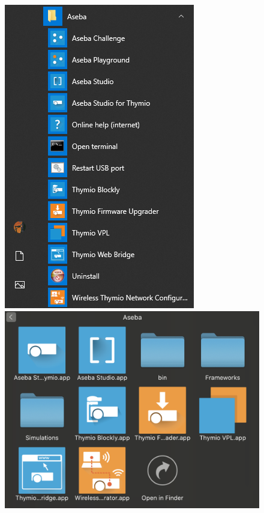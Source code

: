 \documentclass[12pt]{article}
\begin{document}
	\begin{figure}[h]
		\begin{minipage}{0.45\textwidth}
        			\centering
			\includegraphics[width=\textwidth]{img/appsWin.png}
		\end{minipage}\hfill	
		\begin{minipage}{0.45\textwidth}
			\includegraphics[width=\textwidth]{img/appsMac.png}

\end{minipage}
\end{figure}
\end{document}
